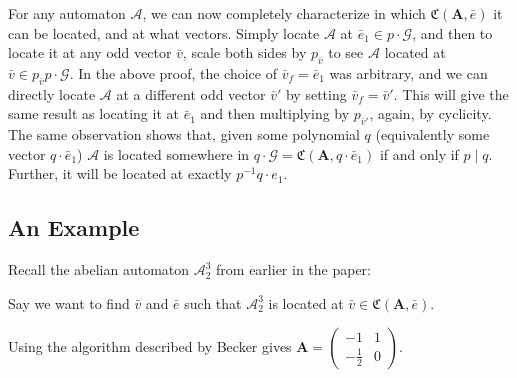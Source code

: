 \documentclass{article}
\newcommand{\A}{\mathcal{A}}
\newcommand{\G}{\mathcal{G}}
\newcommand{\C}{\mathfrak{C}(\Am,\e)}
\newcommand{\2}{\textbf{2}}
\newcommand{\Am}{\textbf{A}}
\newcommand{\vv}{\bar{v}}
\newcommand{\e}{\bar{e}}
\theoremstyle{definition}
\begin{document}
For any automaton $\A$, we can now completely characterize in
which $\C$ it can be located, and at what vectors.
Simply locate $\A$ at $\e_1 \in p \cdot \G$, and then to locate it at
any odd vector $\vv$, scale both sides by $p_{\vv}$ to see $\A$ located at
$\vv \in p_{\vv} p \cdot \G$. 
In the above proof, the choice of $\vv_f = \e_1$ was arbitrary, and we can
directly locate $\A$ at a different odd vector $\vv'$ by setting 
$\vv_f = \vv'$. This will give the same result as locating it at $\e_1$ and 
then multiplying by $p_{\vv'}$, again, by cyclicity.
The same observation shows that, given some polynomial $q$ 
(equivalently some vector $q \cdot \e_1$) $\A$ is located somewhere in 
$q \cdot \G = \mathfrak{C}(\Am,q \cdot \e_1)$ if and only if $p \mid q$. 
Further, it will be located at exactly $p^{-1}q \cdot e_1$.

\subsection{An Example}
Recall the abelian automaton $\A^3_2$ from earlier in the paper:

\begin{center}
\end{center}

Say we want to find $\vv$ and $\e$ such that $\A^3_2$ is located at 
$\vv \in \C$.

Using the algorithm described by Becker \cite{Becker18:thesis} gives 
$\Am = \begin{pmatrix} -1 & 1 \\ -\frac{1}{2} & 0 \end{pmatrix}$.
\end{document}
